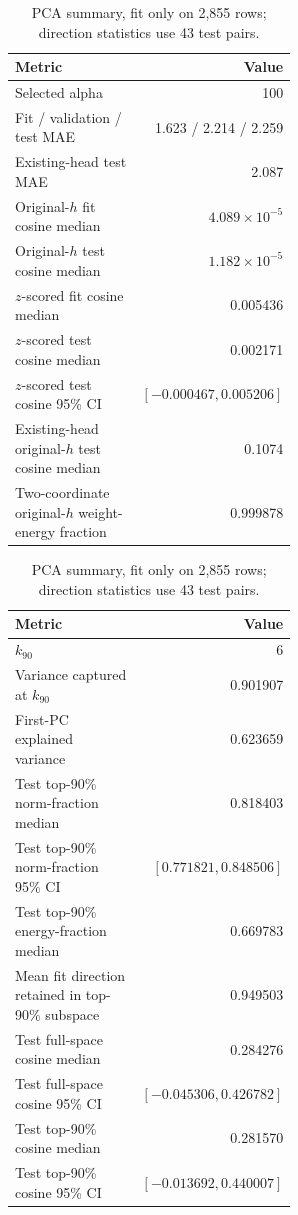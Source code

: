 \documentclass[11pt]{article}
\begin{document}
\begin{table}[h]
\centering
\scriptsize
\setlength{\tabcolsep}{3pt}
\renewcommand{\arraystretch}{0.94}
\begin{minipage}[t]{0.49\linewidth}
\centering
\caption{Frozen-readout summary. Intervals are pair-level bootstrap 95\% CIs over 43 test pairs.}
\label{tab:ridge_si}
\begin{tabular}{@{}p{0.56\linewidth}r@{}}
\toprule
Metric & Value \\
\midrule
Selected alpha & 100 \\
Fit / validation / test MAE & 1.623 / 2.214 / 2.259 \\
Existing-head test MAE & 2.087 \\
Original-$h$ fit cosine median & $4.089\times10^{-5}$ \\
Original-$h$ test cosine median & $1.182\times10^{-5}$ \\
$z$-scored fit cosine median & 0.005436 \\
$z$-scored test cosine median & 0.002171 \\
$z$-scored test cosine 95\% CI & $[-0.000467,0.005206]$ \\
Existing-head original-$h$ test cosine median & 0.1074 \\
Two-coordinate original-$h$ weight-energy fraction & 0.999878 \\
\bottomrule
\end{tabular}
\end{minipage}\hfill
\begin{minipage}[t]{0.49\linewidth}
\centering
\caption{PCA summary, fit only on 2{,}855 rows; direction statistics use 43 test pairs.}
\label{tab:pca_si}
\begin{tabular}{@{}p{0.56\linewidth}r@{}}
\toprule
Metric & Value \\
\midrule
$k_{90}$ & 6 \\
Variance captured at $k_{90}$ & 0.901907 \\
First-PC explained variance & 0.623659 \\
Test top-90\% norm-fraction median & 0.818403 \\
Test top-90\% norm-fraction 95\% CI & $[0.771821,0.848506]$ \\
Test top-90\% energy-fraction median & 0.669783 \\
Mean fit direction retained in top-90\% subspace & 0.949503 \\
Test full-space cosine median & 0.284276 \\
Test full-space cosine 95\% CI & $[-0.045306,0.426782]$ \\
Test top-90\% cosine median & 0.281570 \\
Test top-90\% cosine 95\% CI & $[-0.013692,0.440007]$ \\
\bottomrule
\end{tabular}
\end{minipage}
\end{table}
\end{document}
